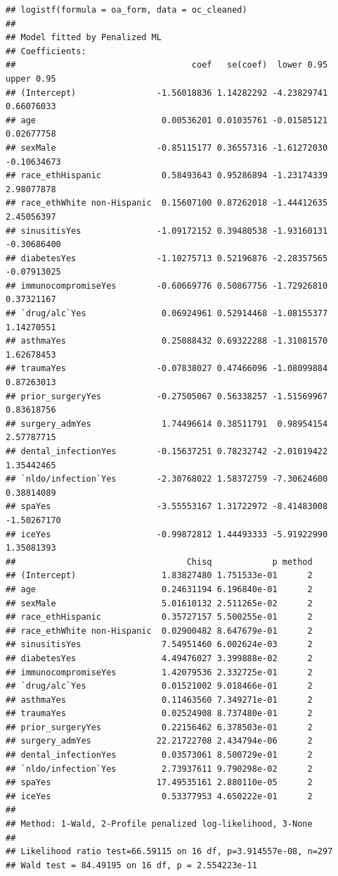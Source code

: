 \documentclass[
]{article}
\begin{document}
\begin{verbatim}
## logistf(formula = oa_form, data = oc_cleaned)
## 
## Model fitted by Penalized ML
## Coefficients:
##                                   coef   se(coef)  lower 0.95  upper 0.95
## (Intercept)                -1.56018836 1.14282292 -4.23829741  0.66076033
## age                         0.00536201 0.01035761 -0.01585121  0.02677758
## sexMale                    -0.85115177 0.36557316 -1.61272030 -0.10634673
## race_ethHispanic            0.58493643 0.95286894 -1.23174339  2.98077878
## race_ethWhite non-Hispanic  0.15607100 0.87262018 -1.44412635  2.45056397
## sinusitisYes               -1.09172152 0.39480538 -1.93160131 -0.30686400
## diabetesYes                -1.10275713 0.52196876 -2.28357565 -0.07913025
## immunocompromiseYes        -0.60669776 0.50867756 -1.72926810  0.37321167
## `drug/alc`Yes               0.06924961 0.52914468 -1.08155377  1.14270551
## asthmaYes                   0.25088432 0.69322288 -1.31081570  1.62678453
## traumaYes                  -0.07838027 0.47466096 -1.08099884  0.87263013
## prior_surgeryYes           -0.27505067 0.56338257 -1.51569967  0.83618756
## surgery_admYes              1.74496614 0.38511791  0.98954154  2.57787715
## dental_infectionYes        -0.15637251 0.78232742 -2.01019422  1.35442465
## `nldo/infection`Yes        -2.30768022 1.58372759 -7.30624600  0.38814089
## spaYes                     -3.55553167 1.31722972 -8.41483008 -1.50267170
## iceYes                     -0.99872812 1.44493333 -5.91922990  1.35081393
##                                  Chisq            p method
## (Intercept)                 1.83827480 1.751533e-01      2
## age                         0.24631194 6.196840e-01      2
## sexMale                     5.01610132 2.511265e-02      2
## race_ethHispanic            0.35727157 5.500255e-01      2
## race_ethWhite non-Hispanic  0.02900482 8.647679e-01      2
## sinusitisYes                7.54951460 6.002624e-03      2
## diabetesYes                 4.49476027 3.399888e-02      2
## immunocompromiseYes         1.42079536 2.332725e-01      2
## `drug/alc`Yes               0.01521002 9.018466e-01      2
## asthmaYes                   0.11463560 7.349271e-01      2
## traumaYes                   0.02524908 8.737480e-01      2
## prior_surgeryYes            0.22156462 6.378503e-01      2
## surgery_admYes             22.21722708 2.434794e-06      2
## dental_infectionYes         0.03573061 8.500729e-01      2
## `nldo/infection`Yes         2.73937611 9.790298e-02      2
## spaYes                     17.49535161 2.880110e-05      2
## iceYes                      0.53377953 4.650222e-01      2
## 
## Method: 1-Wald, 2-Profile penalized log-likelihood, 3-None
## 
## Likelihood ratio test=66.59115 on 16 df, p=3.914557e-08, n=297
## Wald test = 84.49195 on 16 df, p = 2.554223e-11
\end{verbatim}
\end{document}
